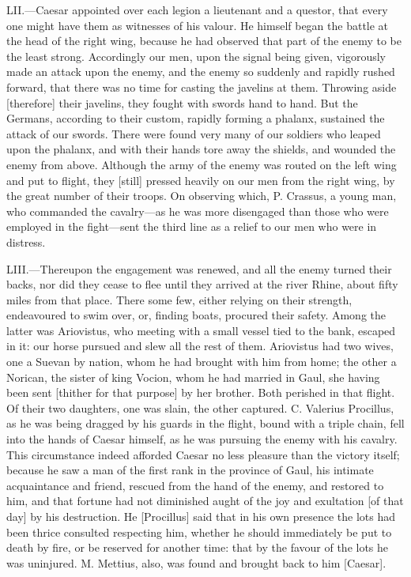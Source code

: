 LII.—Caesar appointed over each legion a lieutenant and a questor, that
every one might have them as witnesses of his valour. He himself began
the battle at the head of the right wing, because he had observed that
part of the enemy to be the least strong. Accordingly our men, upon the
signal being given, vigorously made an attack upon the enemy, and the
enemy so suddenly and rapidly rushed forward, that there was no time for
casting the javelins at them. Throwing aside [therefore] their javelins,
they fought with swords hand to hand. But the Germans, according to
their custom, rapidly forming a phalanx, sustained the attack of our
swords. There were found very many of our soldiers who leaped upon the
phalanx, and with their hands tore away the shields, and wounded the
enemy from above. Although the army of the enemy was routed on the left
wing and put to flight, they [still] pressed heavily on our men from the
right wing, by the great number of their troops. On observing which, P.
Crassus, a young man, who commanded the cavalry—as he was more
disengaged than those who were employed in the fight—sent the third
line as a relief to our men who were in distress.

LIII.—Thereupon the engagement was renewed, and all the enemy turned
their backs, nor did they cease to flee until they arrived at the river
Rhine, about fifty miles from that place. There some few, either relying
on their strength, endeavoured to swim over, or, finding boats, procured
their safety. Among the latter was Ariovistus, who meeting with a small
vessel tied to the bank, escaped in it: our horse pursued and slew all
the rest of them. Ariovistus had two wives, one a Suevan by nation, whom
he had brought with him from home; the other a Norican, the sister of
king Vocion, whom he had married in Gaul, she having been sent [thither
for that purpose] by her brother. Both perished in that flight. Of their
two daughters, one was slain, the other captured. C. Valerius Procillus,
as he was being dragged by his guards in the flight, bound with a triple
chain, fell into the hands of Caesar himself, as he was pursuing the
enemy with his cavalry. This circumstance indeed afforded Caesar no less
pleasure than the victory itself; because he saw a man of the first rank
in the province of Gaul, his intimate acquaintance and friend, rescued
from the hand of the enemy, and restored to him, and that fortune had
not diminished aught of the joy and exultation [of that day] by his
destruction. He [Procillus] said that in his own presence the lots had
been thrice consulted respecting him, whether he should immediately be
put to death by fire, or be reserved for another time: that by the
favour of the lots he was uninjured. M. Mettius, also, was found and
brought back to him [Caesar].

